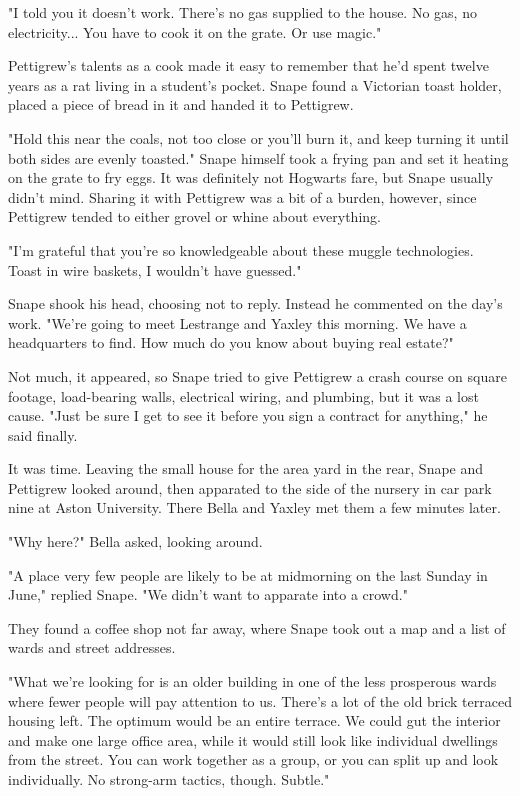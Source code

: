 \documentclass[a4paper,11pt]{article}
\begin{document}
"I told you it doesn't work. There's no gas supplied to the house. No gas, no electricity... You have to cook it on the grate. Or use magic."

Pettigrew's talents as a cook made it easy to remember that he'd spent twelve years as a rat living in a student's pocket. Snape found a Victorian toast holder, placed a piece of bread in it and handed it to Pettigrew.

"Hold this near the coals, not too close or you'll burn it, and keep turning it until both sides are evenly toasted." Snape himself took a frying pan and set it heating on the grate to fry eggs. It was definitely not Hogwarts fare, but Snape usually didn't mind. Sharing it with Pettigrew was a bit of a burden, however, since Pettigrew tended to either grovel or whine about everything.

"I'm grateful that you're so knowledgeable about these muggle technologies. Toast in wire baskets, I wouldn't have guessed."

Snape shook his head, choosing not to reply. Instead he commented on the day's work. "We're going to meet Lestrange and Yaxley this morning. We have a headquarters to find. How much do you know about buying real estate?"

Not much, it appeared, so Snape tried to give Pettigrew a crash course on square footage, load-bearing walls, electrical wiring, and plumbing, but it was a lost cause. "Just be sure I get to see it before you sign a contract for anything," he said finally.

It was time. Leaving the small house for the area yard in the rear, Snape and Pettigrew looked around, then apparated to the side of the nursery in car park nine at Aston University. There Bella and Yaxley met them a few minutes later.

"Why here?" Bella asked, looking around.

"A place very few people are likely to be at midmorning on the last Sunday in June," replied Snape. "We didn't want to apparate into a crowd."

They found a coffee shop not far away, where Snape took out a map and a list of wards and street addresses.

"What we're looking for is an older building in one of the less prosperous wards where fewer people will pay attention to us. There's a lot of the old brick terraced housing left. The optimum would be an entire terrace. We could gut the interior and make one large office area, while it would still look like individual dwellings from the street. You can work together as a group, or you can split up and look individually. No strong-arm tactics, though. Subtle."
\end{document}

